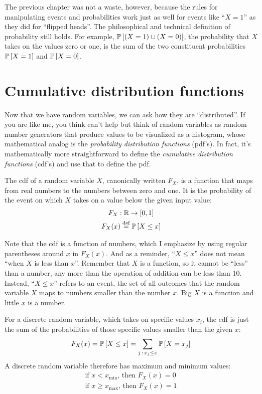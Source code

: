 The previous chapter was not a waste, however, because the rules for
manipulating events and probabilities work just as well for events like ``$X =
1$'' as they did for ``flipped heads''. The philosophical and technical
definition of probability still holds. For example, $\mathbb{P}\left[{(X = 1) \cup (X =
0)}\right]$, the probability that $X$ takes on the values zero or one, is the sum of
the two constituent probabilities $\mathbb{P}\left[{X=1}\right]$ and $\mathbb{P}\left[{X=0}\right]$.

\section{Cumulative distribution functions}

Now that we have random variables, we can ask how they are ``distributed''.  If
you are like me, you think can't help but think of random variables as random
number generators that produce values to be visualized as a histogram, whose
mathematical analog is the \emph{probability distribution functions} (pdf's).
In fact, it's mathematically more straightforward to define the
\emph{cumulative distribution functions} (cdf's) and use that to define the pdf.

The cdf of a random variable $X$, canonically written $F_X$, is a function that
maps from real numbers to the numbers between zero and one. It is the
probability of the event on which $X$ takes on a value below the given input
value:
\begin{gather*}
F_X : \mathbb{R} \to [0, 1] \\
F_X(x) \stackrel{\text{def}}{=} \mathbb{P}\left[{X \leq x}\right]
\end{gather*}

Note that the cdf is a function of numbers, which I emphasize by using regular
parentheses around $x$ in $F_X(x)$. And as a reminder, ``$X \leq x$'' does not
mean ``when $X$ is less than $x$''. Remember that $X$ is a function, so it
cannot be ``less'' than a number, any more than the operation of addition can
be less than 10.  Instead, ``$X \leq x$'' refers to an event, the set of all
outcomes that the random variable $X$ maps to numbers smaller than the number
$x$. Big $X$ is a function and little $x$ is a number.

For a discrete random variable, which takes on specific values $x_i$, the cdf is
just the sum of the probabilities of those specific values smaller than the
given $x$:
\begin{equation*}
F_X(x) = \mathbb{P}\left[{X \leq x}\right] = \sum_{j \,:\, x_j \leq x} \mathbb{P}\left[{X = x_j}\right]
\end{equation*}
A discrete random variable therefore has maximum and minimum values:
\begin{gather}
\text{if } x < x_\mathrm{min} \text{, then } F_X(x) = 0 \\
\text{if } x \geq x_\mathrm{max} \text{, then } F_X(x) = 1
\end{gather}

